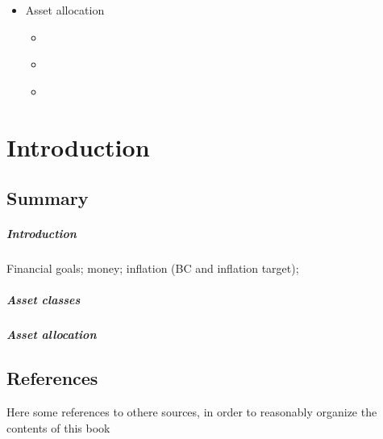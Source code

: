 \documentclass[letterpaper,10pt,italian]{jupyterBook}
\begin{document}
\begin{itemize}
\item {} 
\sphinxAtStartPar
Asset allocation

\begin{itemize}
\item {} 
\sphinxAtStartPar
{\hyperref[\detokenize{ch/investing/intro::doc}]{}}

\item {} 
\sphinxAtStartPar
{\hyperref[\detokenize{ch/investing/mpt::doc}]{}}

\item {} 
\sphinxAtStartPar
{\hyperref[\detokenize{ch/investing/capm::doc}]{}}

\end{itemize}
\end{itemize}

\sphinxstepscope


\part{Introduction}

\sphinxstepscope


\chapter{Summary}
\label{\detokenize{ch/summary:summary}}\label{\detokenize{ch/summary:fin-edu-summary}}\label{\detokenize{ch/summary::doc}}\subsubsection*{Introduction}

\sphinxAtStartPar
Financial goals; money; inflation (BC and inflation target);
\subsubsection*{Asset classes}
\subsubsection*{Asset allocation}

\sphinxstepscope


\chapter{References}
\label{\detokenize{ch/references:references}}\label{\detokenize{ch/references::doc}}
\sphinxAtStartPar
Here some references to othere sources, in order to reasonably organize the contents of this book
\end{document}
